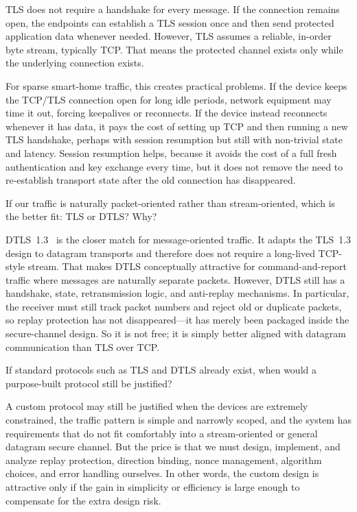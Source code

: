 TLS does not require a handshake for every message.
If the connection remains open, the endpoints can establish a TLS session once
and then send protected application data whenever needed.
However, TLS assumes a reliable, in-order byte stream, typically TCP.
That means the protected channel exists only while the underlying connection
exists.

For sparse smart-home traffic, this creates practical problems.
If the device keeps the TCP/TLS connection open for long idle periods, network
equipment may time it out, forcing keepalives or reconnects.
If the device instead reconnects whenever it has data, it pays the cost of
setting up TCP and then running a new TLS handshake, perhaps with session
resumption but still with non-trivial state and latency.
Session resumption helps, because it avoids the cost of a full fresh
authentication and key exchange every time, but it does not remove the need to
re-establish transport state after the old connection has disappeared.

\begin{exercise}
  If our traffic is naturally packet-oriented rather than stream-oriented,
  which is the better fit: TLS or DTLS?
  Why?
\end{exercise}

DTLS~1.3~\autocite{RFC9147} is the closer match for message-oriented
traffic.
It adapts the TLS~1.3 design to datagram transports and therefore does not
require a long-lived TCP-style stream.
That makes DTLS conceptually attractive for command-and-report traffic where
messages are naturally separate packets.
However, DTLS still has a handshake, state, retransmission logic, and
anti-replay mechanisms.
In particular, the receiver must still track packet numbers and reject old or
duplicate packets, so replay protection has not disappeared---it has merely
been packaged inside the secure-channel design.
So it is not free; it is simply better aligned with datagram communication
than TLS over TCP.

\begin{exercise}
  If standard protocols such as TLS and DTLS already exist, when would a
  purpose-built protocol still be justified?
\end{exercise}

A custom protocol may still be justified when the devices are extremely
constrained, the traffic pattern is simple and narrowly scoped, and the system
has requirements that do not fit comfortably into a stream-oriented or general
datagram secure channel.
But the price is that we must design, implement, and analyze replay
protection, direction binding, nonce management, algorithm choices, and error
handling ourselves.
In other words, the custom design is attractive only if the gain in simplicity
or efficiency is large enough to compensate for the extra design risk.

